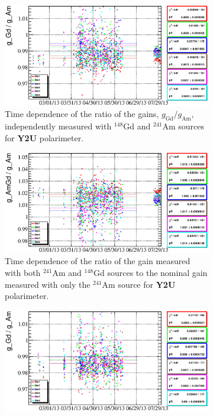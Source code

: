 \documentclass[a4paper,12pt]{article}
\newcommand\americium{${}^{241}$Am}
\newcommand\gadolinium{${}^{148}$Gd}
\begin{document}
\newcommand\gainrealationslabel{Comparison of the effective detector gains
calculated with either one or both $\alpha$-sources for the polarimeters
equipped with two alpha sources. Colors represent individual detectors.}
\begin{figure}
%
\begin{subfigure}[t]{0.49\textwidth}
\includegraphics[width=\textwidth]{gfx/run13_alpha_study_novoltagevariation/Y2U/c_chGdGain_over_AmGain_by_day_Y2U.eps}
\caption{Time dependence of the ratio of the gains, $g_\text{Gd}/g_\text{Am}$,
independently measured with \gadolinium{} and \americium{} sources for
\textbf{Y2U} polarimeter.}
\end{subfigure}
%
\hfill
%
\begin{subfigure}[t]{0.49\textwidth}
\includegraphics[width=\textwidth]{gfx/run13_alpha_study_novoltagevariation/Y2U/c_chAmGdGain_over_AmGain_by_day_Y2U.eps}
\caption{Time dependence of the ratio of the gain measured with both \americium{} and
\gadolinium{} sources to the nominal gain measured with only the \americium{}
source for \textbf{Y2U} polarimeter.}
\end{subfigure}
%
\begin{subfigure}[t]{0.49\textwidth}
\includegraphics[width=\textwidth]{gfx/run13_alpha_study_novoltagevariation/B2D/c_chGdGain_over_AmGain_by_day_B2D.eps}

\end{subfigure}
\end{figure}
\end{document}
